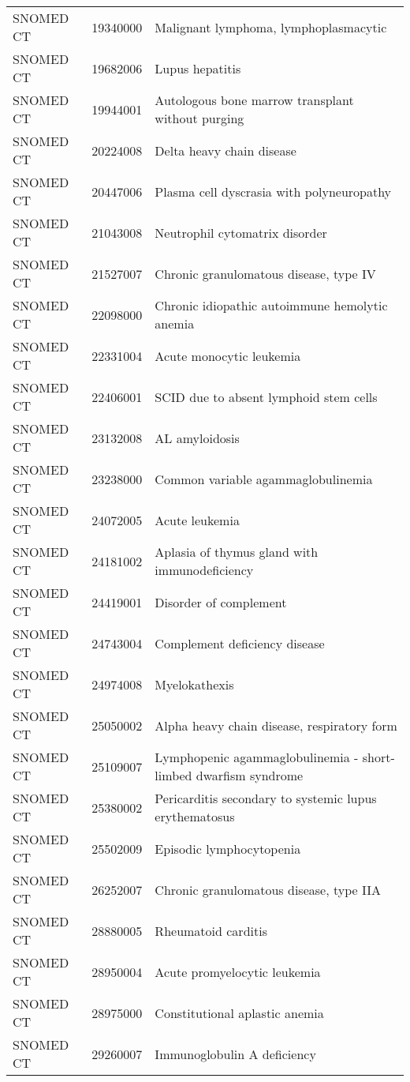 \begin{longtable}{p{}p{}p{}}
  SNOMED CT & 19340000 & Malignant lymphoma, lymphoplasmacytic \\ 
  SNOMED CT & 19682006 & Lupus hepatitis \\ 
  SNOMED CT & 19944001 & Autologous bone marrow transplant without purging \\ 
  SNOMED CT & 20224008 & Delta heavy chain disease \\ 
  SNOMED CT & 20447006 & Plasma cell dyscrasia with polyneuropathy \\ 
  SNOMED CT & 21043008 & Neutrophil cytomatrix disorder \\ 
  SNOMED CT & 21527007 & Chronic granulomatous disease, type IV \\ 
  SNOMED CT & 22098000 & Chronic idiopathic autoimmune hemolytic anemia \\ 
  SNOMED CT & 22331004 & Acute monocytic leukemia \\ 
  SNOMED CT & 22406001 & SCID due to absent lymphoid stem cells \\ 
  SNOMED CT & 23132008 & AL amyloidosis \\ 
  SNOMED CT & 23238000 & Common variable agammaglobulinemia \\ 
  SNOMED CT & 24072005 & Acute leukemia \\ 
  SNOMED CT & 24181002 & Aplasia of thymus gland with immunodeficiency \\ 
  SNOMED CT & 24419001 & Disorder of complement \\ 
  SNOMED CT & 24743004 & Complement deficiency disease \\ 
  SNOMED CT & 24974008 & Myelokathexis \\ 
  SNOMED CT & 25050002 & Alpha heavy chain disease, respiratory form \\ 
  SNOMED CT & 25109007 & Lymphopenic agammaglobulinemia - short-limbed dwarfism syndrome \\ 
  SNOMED CT & 25380002 & Pericarditis secondary to systemic lupus erythematosus \\ 
  SNOMED CT & 25502009 & Episodic lymphocytopenia \\ 
  SNOMED CT & 26252007 & Chronic granulomatous disease, type IIA \\ 
  SNOMED CT & 28880005 & Rheumatoid carditis \\ 
  SNOMED CT & 28950004 & Acute promyelocytic leukemia \\ 
  SNOMED CT & 28975000 & Constitutional aplastic anemia \\ 
  SNOMED CT & 29260007 & Immunoglobulin A deficiency \\ 

\end{longtable}
